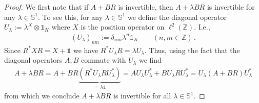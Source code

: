 \documentclass[a4paper,10pt]{article}
\numberwithin{equation}{section}
\theoremstyle{plain}
\theoremstyle{plain}
\theoremstyle{plain}
\theoremstyle{plain}
\theoremstyle{plain}
\theoremstyle{remark}
\theoremstyle{definition}
\theoremstyle{plain}
\newcommand{\ZZ}{\mathbb{Z}}
\newcommand{\bS}{\mathbb{S}}
\newcommand{\Id}{\mathds{1}}
\newcommand{\eq}[1]{\begin{align*}#1\end{align*}}
\begin{document}
	\begin{proof}
		We first note that if $A+BR$ is invertible, then $A+\lambda BR$ is invertible for any $\lambda\in\bS^1$. To see this, for any $\lambda\in\bS^1$ we define the diagonal operator $U_\lambda:= \lambda^X\otimes \Id_K$ where $X$ is the position operator on $\ell^2(\ZZ)$. I.e., \eq{(U_\lambda)_{nm}:=\delta_{nm}\lambda^n \Id_K\qquad(n,m\in\ZZ)\,.} Since $R^\ast X R = X+\Id$ we have $R^\ast U_\lambda R  = \lambda U_\lambda$. Thus, using the fact that the diagonal operators $A,B$ commute with $U_\lambda$ we find \eq{A+\lambda BR = A + BR \underbrace{\left(R^\ast U_\lambda R U_\lambda^\ast\right)}_{=\lambda\Id}=A U_\lambda U_\lambda^\ast +B U_\lambda R U_\lambda^\ast = U_\lambda\left(A+BR\right)U_\lambda^\ast } from which we conclude $A+\lambda BR$ is invertible for all $\lambda\in\bS^1$.
		

\end{proof}
\end{document}
